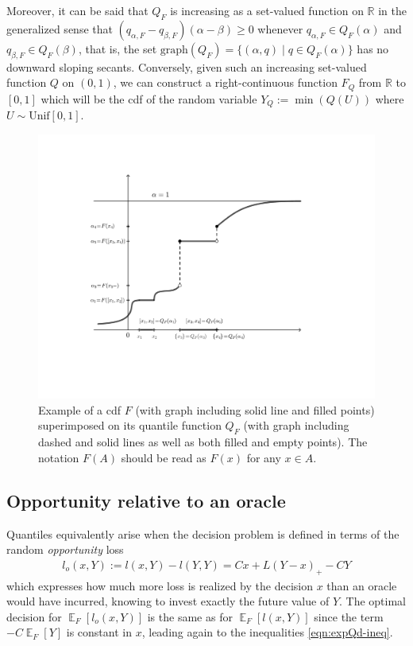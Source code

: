 \documentclass{article}\usepackage[]{graphicx}\usepackage[]{xcolor}
\DeclareMathOperator{\Ex}{\mathbb{E}}
\begin{document}
Moreover, it can be said that $Q_F$ is increasing as a set-valued function on $\mathbb{R}$ in the generalized sense that 
$(q_{\alpha, F} - q_{\beta, F})(\alpha-\beta) \geq 0$ whenever
$q_{\alpha, F} \in Q_F(\alpha)$ and $q_{\beta, F} \in Q_F(\beta)$, that is, the set 
$\mathrm{graph}(Q_F) = \{(\alpha, q) \mid q \in Q_F(\alpha)\}$ has no downward sloping secants. Conversely, given such an 
increasing set-valued function $Q$ on $(0,1)$, we can construct a right-continuous function $F_Q$ from $\mathbb{R}$ to $[0,1]$ 
which will be the cdf of the random variable $Y_Q := \min(Q(U))$ where $U \sim \mathrm{Unif}[0,1]$.
\begin{figure}
\vspace{-1cm}
\includegraphics[width=\textwidth]{../figures/FQ.pdf}
\vspace{-15mm}
\caption{Example of a cdf $F$ (with graph including solid line and filled points) superimposed on its 
quantile function $Q_F$ (with graph including dashed and solid lines as well as both filled and empty points).
The notation $F(A)$ should be read as $F(x)$ for any $x\in A$.}
\label{fig:FQ}
\end{figure}

\subsection{Opportunity relative to an oracle}
Quantiles equivalently arise when the decision problem is defined in terms of the random \emph{opportunity} loss 
\begin{align}
l_o(x,Y) := l(x,Y) - l(Y,Y) = Cx + L(Y-x)_{+} - CY \label{eqn:opp-loss}
\end{align}
which expresses how much more loss is realized by the decision $x$ than an oracle would have incurred, knowing to invest exactly
the future value of $Y$. The optimal decision for $\Ex_F[l_o(x,Y)]$ is the same as for $\Ex_F[l(x,Y)]$ since the term $-C\Ex_F[Y]$ is 
constant in $x$, leading again to the inequalities \eqref{eqn:expQd-ineq}.
\end{document}
